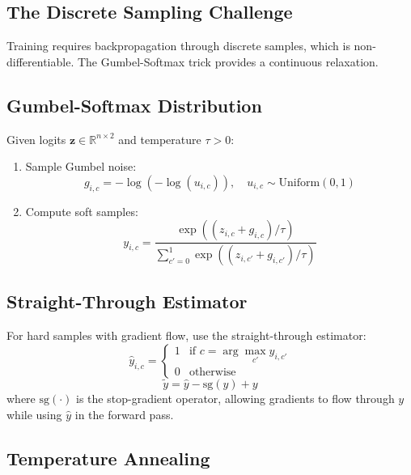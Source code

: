 \documentclass[11pt,a4paper]{article}
\newcommand{\R}{\mathbb{R}}
\begin{document}
\subsection{The Discrete Sampling Challenge}

Training requires backpropagation through discrete samples, which is non-differentiable. The Gumbel-Softmax trick provides a continuous relaxation.

\subsection{Gumbel-Softmax Distribution}

Given logits $\mathbf{z} \in \R^{n \times 2}$ and temperature $\tau > 0$:

\begin{enumerate}
    \item Sample Gumbel noise:
    \begin{equation}
        g_{i,c} = -\log(-\log(u_{i,c})), \quad u_{i,c} \sim \text{Uniform}(0,1)
    \end{equation}

    \item Compute soft samples:
    \begin{equation}
        y_{i,c} = \frac{\exp((z_{i,c} + g_{i,c})/\tau)}{\sum_{c'=0}^{1} \exp((z_{i,c'} + g_{i,c'})/\tau)}
    \end{equation}
\end{enumerate}

\subsection{Straight-Through Estimator}

For hard samples with gradient flow, use the straight-through estimator:
\begin{equation}
    \hat{y}_{i,c} = \begin{cases}
        1 & \text{if } c = \arg\max_{c'} y_{i,c'} \\
        0 & \text{otherwise}
    \end{cases}
\end{equation}
\begin{equation}
    \tilde{y} = \hat{y} - \text{sg}(y) + y
\end{equation}
where $\text{sg}(\cdot)$ is the stop-gradient operator, allowing gradients to flow through $y$ while using $\hat{y}$ in the forward pass.

\subsection{Temperature Annealing}
\end{document}
